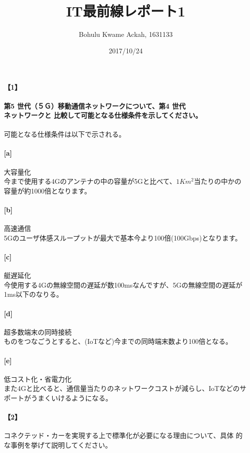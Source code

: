 \documentclass[20 pts]{article}
\title{IT最前線レポート1}
\author{Bohulu Kwame Ackah, 1631133}
\date{2017/10/24}
\begin{document}
\maketitle

\newpage
\paragraph{【1】}
\textbf{第5 世代（５Ｇ）移動通信ネットワークについて、第4 世代\\ネットワークと
比較して可能となる仕様条件を示してください。}

\paragraph{}
可能となる仕様条件は以下で示される。

\paragraph{[a]}大容量化\\
今まで使用する4Gのアンテナの中の容量が5Gと比べて、$1Km^2$当たりの中かの容量が約1000倍となります。
\paragraph{[b]}高速通信\\
5Gのユーザ体感スループットが最大で基本今より100倍(100Gbps)となります。

\paragraph{[c]}艇遅延化\\
今使用する4Gの無線空間の遅延が数100msなんですが、5Gの無線空間の遅延が1ms以下のなりる。

\paragraph{[d]}超多数端末の同時接続\\
ものをつなごうとすると、(IoTなど)今までの同時端末数より100倍となる。
\paragraph{[e]}低コスト化・省電力化\\
また4Gと比べると、通信量当たりのネットワークコストが減らし、IoTなどのサポートがうまくいけるようになる。

\newpage
\paragraph{【2】}コネクテッド・カーを実現する上で標準化が必要になる理由について、具体
的な事例を挙げて説明してください。\\
\end{document}
